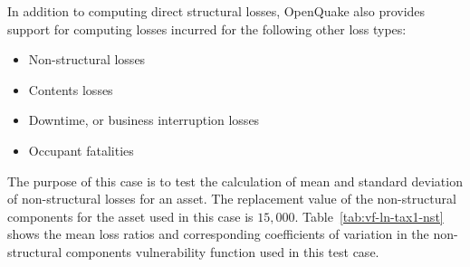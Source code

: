 In addition to computing direct structural losses, OpenQuake also provides support for computing losses incurred for the following other loss types:

\begin{itemize}
\item{Non-structural losses}
\item{Contents losses}
\item{Downtime, or business interruption losses}
\item{Occupant fatalities}
\end{itemize}



The purpose of this case is to test the calculation of mean and standard deviation of non-structural losses for an asset. The replacement value of the non-structural components for the asset used in this case is $15,000$. Table~\ref{tab:vf-ln-tax1-nst} shows the mean loss ratios and corresponding coefficients of variation in the non-structural components vulnerability function used in this test case.